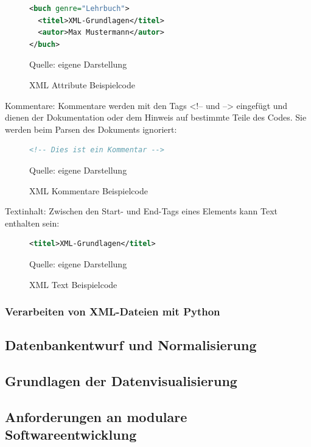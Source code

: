 \begin{figure}[H]
\centering
\begin{minipage}{0.95\textwidth}
\begin{lstlisting}[language=XML]
<buch genre="Lehrbuch">
  <titel>XML-Grundlagen</titel>
  <autor>Max Mustermann</autor>
</buch>
\end{lstlisting}
\end{minipage}
\caption{XML Attribute Beispielcode}
\label{fig:XML Attribute Beispielcode}
    {Quelle: eigene Darstellung}
\end{figure}

Kommentare: Kommentare werden mit den Tags <!-- und --> eingefügt und dienen der Dokumentation oder dem Hinweis auf bestimmte Teile des Codes.
Sie werden beim Parsen des Dokuments ignoriert:

\begin{figure}[H]
\centering
\begin{minipage}{0.95\textwidth}
\begin{lstlisting}[language=XML]
<!-- Dies ist ein Kommentar -->
\end{lstlisting}
\end{minipage}
\caption{XML Kommentare Beispielcode}
\label{fig:XML Kommentare Beispielcode}
    {Quelle: eigene Darstellung}
\end{figure}

Textinhalt: Zwischen den Start- und End-Tags eines Elements kann Text enthalten sein:

\begin{figure}[H]
\centering
\begin{minipage}{0.95\textwidth}
\begin{lstlisting}[language=XML]
<titel>XML-Grundlagen</titel>
\end{lstlisting}
\end{minipage}
\caption{XML Text Beispielcode}
\label{fig:XML Text Beispielcode}
    {Quelle: eigene Darstellung}
\end{figure}

\subsubsection{Verarbeiten von XML-Dateien mit Python}

\pagebreak
\subsection{Datenbankentwurf und Normalisierung}

\subsection{Grundlagen der Datenvisualisierung}

\subsection{Anforderungen an modulare Softwareentwicklung}